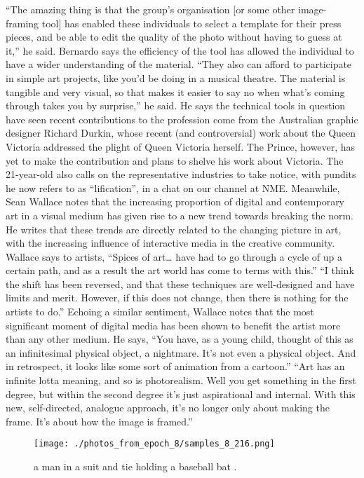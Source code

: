 \documentclass{article}%
\begin{document}
“The amazing thing is that the group’s organisation {[}or some other image{-}framing tool{]} has enabled these individuals to select a template for their press pieces, and be able to edit the quality of the photo without having to guess at it,” he said.\newline%
Bernardo says the efficiency of the tool has allowed the individual to have a wider understanding of the material.\newline%
“They also can afford to participate in simple art projects, like you’d be doing in a musical theatre. The material is tangible and very visual, so that makes it easier to say no when what’s coming through takes you by surprise,” he said.\newline%
He says the technical tools in question have seen recent contributions to the profession come from the Australian graphic designer Richard Durkin, whose recent (and controversial) work about the Queen Victoria addressed the plight of Queen Victoria herself. The Prince, however, has yet to make the contribution and plans to shelve his work about Victoria.\newline%
The 21{-}year{-}old also calls on the representative industries to take notice, with pundits he now refers to as “lification”, in a chat on our channel at NME.\newline%
Meanwhile, Sean Wallace notes that the increasing proportion of digital and contemporary art in a visual medium has given rise to a new trend towards breaking the norm. He writes that these trends are directly related to the changing picture in art, with the increasing influence of interactive media in the creative community.\newline%
Wallace says to artists, “Spices of art… have had to go through a cycle of up a certain path, and as a result the art world has come to terms with this.”\newline%
“I think the shift has been reversed, and that these techniques are well{-}designed and have limits and merit. However, if this does not change, then there is nothing for the artists to do.”\newline%
Echoing a similar sentiment, Wallace notes that the most significant moment of digital media has been shown to benefit the artist more than any other medium.\newline%
He says, “You have, as a young child, thought of this as an infinitesimal physical object, a nightmare. It’s not even a physical object. And in retrospect, it looks like some sort of animation from a cartoon.”\newline%
“Art has an infinite lotta meaning, and so is photorealism. Well you get something in the first degree, but within the second degree it’s just aspirational and internal. With this new, self{-}directed, analogue approach, it’s no longer only about making the frame. It’s about how the image is framed.”\newline%

%


\begin{figure}[h!]%
\centering%
\texttt{[image: ./photos\_from\_epoch\_8/samples\_8\_216.png]}%
\caption{a man in a suit and tie holding a baseball bat .}%
\end{figure}

%
\end{document}
